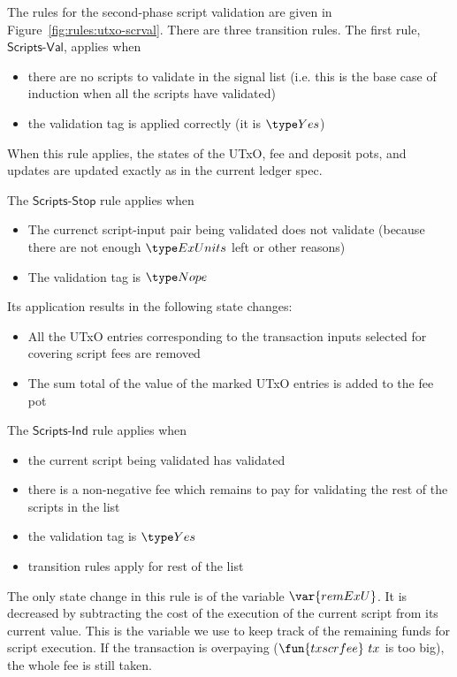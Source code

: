 The rules for the second-phase script validation are given in
Figure~\ref{fig:rules:utxo-scrval}. There are three transition rules.
The first rule, $\mathsf{Scripts\mbox{-}Val}$, applies when

\begin{itemize}
\item there
are no scripts to validate in the signal list (i.e. this is the base case of
induction when all the scripts have validated)
\item the validation tag is applied correctly (it is $\Yes$)
\end{itemize}

When this rule applies, the states of the UTxO, fee
  and deposit pots, and updates are updated exactly as in the current
  ledger spec.

The $\mathsf{Scripts\mbox{-}Stop}$ rule applies when

\begin{itemize}
  \item The currenct script-input pair being validated does not validate
  (because there are not enough $\ExUnits$ left or other reasons)
  \item The validation tag is $\Nope$
\end{itemize}

Its application results in the following state changes:

\begin{itemize}
  \item All the
  UTxO entries corresponding to the transaction inputs selected for covering
  script fees are removed

  \item The sum total of the value of the marked UTxO entries
  is added to the fee pot
\end{itemize}

The $\mathsf{Scripts\mbox{-}Ind}$ rule applies when

\begin{itemize}
  \item the current script being validated has validated
  \item there is a non-negative fee which remains to pay for validating
  the rest of the scripts in the list
  \item the validation tag is $\Yes$
  \item transition rules apply for rest of the list
\end{itemize}

The only state change in this rule is of the variable $\var{remExU}$.
It is decreased by subtracting the cost of the execution of the
current script from its current value.
This is the variable we use to keep track of the remaining funds for
script execution. If the transaction is overpaying ($\fun{txscrfee}~{tx}$
is too big), the whole fee is still taken.

